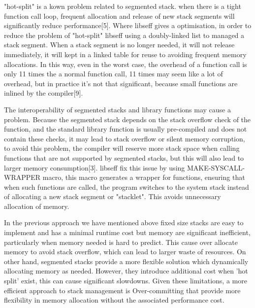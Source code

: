 \documentclass{article}
\begin{document}
\medskip

"hot-split" is a kown problem related to segmented stack. when there is a tight function call loop, frequent allocation and release of new stack segments will significantly reduce performance[5]. Where libseff gives a optimisation, in order to reduce the problem of "hot-split" libseff using a doubly-linked list to managed a stack segment. When a stack segment is no longer needed, it will not release immediately, it will kept in a linked table for reuse to avoiding frequent memory allocations. In this way, even in the worst case, the overhead of a function call is only 11 times the a normal function call, 11 times may seem like a lot of overhead, but in practice it's not that significant, because small functions are inlined by the compiler[9].

\medskip

The interoperability of segmented stacks and library functions may cause a problem. Because the segmented stack depends on the stack overflow check of the function, and the standard library function is usually pre-compiled and does not contain these checks, it may lead to stack overflow or silent memory corruption, to avoid this problem, the compiler will reserve more stack space when calling functions that are not supported by segmented stacks, but this will also lead to larger memory consumption[3]. libseff fix this issue by using MAKE-SYSCALL-WRAPPER macro, this macro generates a wrapper for functions, ensuring that when such functions are called, the program switches to the system stack instead of allocating a new stack segment or "stacklet". This avoids unnecessary allocation of memory.



\medskip

In the previous approach we have mentioned above fixed size stacks are easy to implement and has a minimal runtime cost but memory are significant inefficient, particularly when memory needed is hard to predict. This cause over allocate memory to avoid stack overflow, which can lead to larger waste of resources. On other hand, segmented stacks provide a more flexible solution which dynamically allocating memory as needed. However, they introduce additional cost when 'hot split' exist, this can cause significant slowdowns. Given these limitations, a more efficient approach to stack management is Over-committing that provide more flexibility in memory allocation without the associated performance cost.

\medskip
\end{document}
